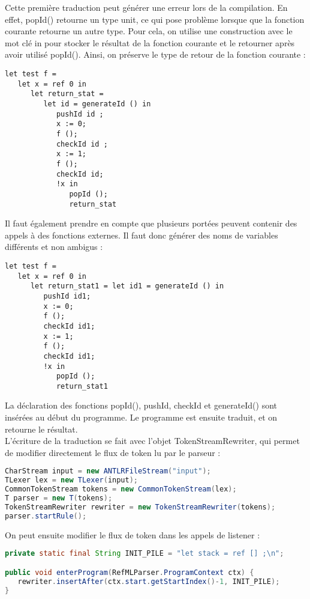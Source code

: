 \documentclass[11pt, a4paper, notitlepage]{article}
\newcommand\tab{{\hspace*{12.5mm}}}
\begin{document}
\tab Cette première traduction peut générer une erreur lors de la compilation. En effet, popId() retourne un type unit, ce qui pose problème lorsque que la fonction courante retourne un autre type. Pour cela, on utilise une construction avec le mot clé in pour stocker le résultat de la fonction courante et le retourner après avoir utilisé popId(). Ainsi, on préserve le type de retour de la fonction courante :

\begin{lstlisting}[language=caml]
let test f =
   let x = ref 0 in
      let return_stat =
         let id = generateId () in
            pushId id ;
            x := 0;
            f ();
            checkId id ;
            x := 1;
            f ();
            checkId id;
            !x in
               popId ();
               return_stat
\end{lstlisting}

\tab Il faut également prendre en compte que plusieurs portées peuvent contenir des appels à des fonctions externes. Il faut donc générer des noms de variables différents et non ambigus :
\newpage
\begin{lstlisting}[language=caml]
let test f =
   let x = ref 0 in
      let return_stat1 = let id1 = generateId () in
         pushId id1;
         x := 0;
         f ();
         checkId id1;
         x := 1;
         f ();
         checkId id1;
         !x in
            popId ();
            return_stat1
\end{lstlisting}

\tab La déclaration des fonctions popId(), pushId, checkId et generateId() sont insérées au début du programme. Le programme est ensuite traduit, et on retourne le résultat.\\
\tab L'écriture de la traduction se fait avec l'objet TokenStreamRewriter, qui permet de modifier directement le flux de token lu par le parseur :

\begin{lstlisting}[language=java]
CharStream input = new ANTLRFileStream("input");
TLexer lex = new TLexer(input);
CommonTokenStream tokens = new CommonTokenStream(lex);
T parser = new T(tokens);
TokenStreamRewriter rewriter = new TokenStreamRewriter(tokens);
parser.startRule();
\end{lstlisting}

\tab On peut ensuite modifier le flux de token dans les appels de listener :

\begin{lstlisting}[language=java]
private static final String INIT_PILE = "let stack = ref [] ;\n";

public void enterProgram(RefMLParser.ProgramContext ctx) {
   rewriter.insertAfter(ctx.start.getStartIndex()-1, INIT_PILE);
}
\end{lstlisting}
\end{document}
